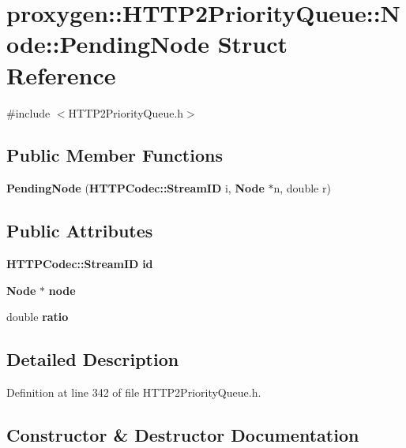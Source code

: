 \section{proxygen\+:\+:H\+T\+T\+P2\+Priority\+Queue\+:\+:Node\+:\+:Pending\+Node Struct Reference}
\label{structproxygen_1_1HTTP2PriorityQueue_1_1Node_1_1PendingNode}


{\ttfamily \#include $<$H\+T\+T\+P2\+Priority\+Queue.\+h$>$}

\subsection*{Public Member Functions}
\begin{DoxyCompactItemize}
\item 
{\bf Pending\+Node} ({\bf H\+T\+T\+P\+Codec\+::\+Stream\+ID} i, {\bf Node} $\ast$n, double r)
\end{DoxyCompactItemize}
\subsection*{Public Attributes}
\begin{DoxyCompactItemize}
\item 
{\bf H\+T\+T\+P\+Codec\+::\+Stream\+ID} {\bf id}
\item 
{\bf Node} $\ast$ {\bf node}
\item 
double {\bf ratio}
\end{DoxyCompactItemize}


\subsection{Detailed Description}


Definition at line 342 of file H\+T\+T\+P2\+Priority\+Queue.\+h.



\subsection{Constructor \& Destructor Documentation}
